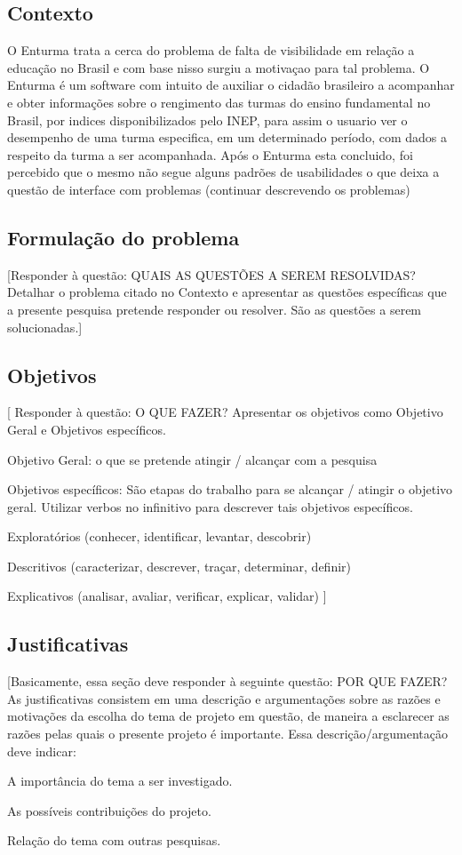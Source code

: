 \subsection{Contexto}

	O Enturma trata a cerca do problema de falta de visibilidade em relação a educação no Brasil e com base nisso surgiu a motivaçao para tal problema.
	O Enturma é um software com intuito de auxiliar o cidadão brasileiro a acompanhar e obter informações sobre o rengimento das turmas do ensino fundamental no Brasil, por indices disponibilizados pelo INEP, para assim o usuario ver o desempenho de uma turma especifica, em um determinado período, com dados a respeito da turma a ser acompanhada.
	Após o Enturma esta concluido, foi percebido que o mesmo não segue alguns padrões de usabilidades o que deixa a questão de interface com problemas (continuar descrevendo os problemas)

\subsection{Formulação do problema}

	[Responder à questão: QUAIS AS QUESTÕES A SEREM RESOLVIDAS?
Detalhar o problema citado no Contexto e apresentar as questões específicas que a presente pesquisa pretende responder ou resolver. São as questões a serem solucionadas.]

\subsection{Objetivos}

	[ Responder à questão: O QUE FAZER?
Apresentar os objetivos como Objetivo Geral e Objetivos específicos.

Objetivo Geral: o que se pretende atingir / alcançar com a pesquisa

Objetivos específicos: São etapas do trabalho para se alcançar / atingir o objetivo geral. Utilizar verbos no infinitivo para descrever tais objetivos específicos.

Exploratórios (conhecer, identificar, levantar, descobrir)

Descritivos (caracterizar, descrever, traçar, determinar, definir)

Explicativos (analisar, avaliar, verificar, explicar, validar)   ]

\subsection{Justificativas}

	[Basicamente, essa seção deve responder à seguinte questão: POR QUE FAZER?
As justificativas consistem em uma descrição e argumentações sobre as razões e motivações da escolha do tema de projeto em questão, de maneira a esclarecer as razões pelas quais o presente projeto é importante.
Essa descrição/argumentação deve indicar:

A importância do tema a ser investigado.

As possíveis contribuições do projeto.

Relação do tema com outras pesquisas.